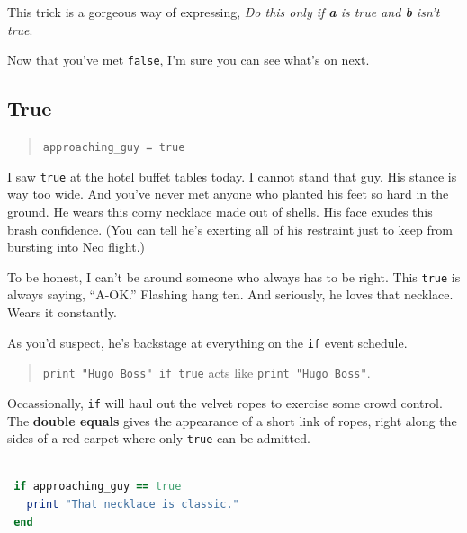 \documentclass[10pt,twoside]{report}
\begin{document}
This trick is a gorgeous way of expressing, {\em Do this only if {\bf
    a} is true and {\bf b} isn't true}.

Now that you've met \lstinline[breaklines=true]|false|, I'm sure you
can see what's on next.


\subsection{True}



\begin{quote}
\lstinline[breaklines=true]|approaching_guy = true|\end{quote}


I saw \lstinline[breaklines=true]|true| at the hotel buffet tables
today.  I cannot stand that guy. His stance is way too wide.  And
you've never met anyone who planted his feet so hard in the ground.
He wears this corny necklace made out of shells.  His face exudes this
brash confidence.  (You can tell he's exerting all of his restraint
just to keep from bursting into Neo flight.)

To be honest, I can't be around someone who always has to be
right. This \lstinline[breaklines=true]|true| is always saying,
``A-OK.''  Flashing hang ten.  And seriously, he loves that necklace.
Wears it constantly.

As you'd suspect, he's backstage at everything on the
\lstinline[breaklines=true]|if| event schedule.

\begin{quote}
\lstinline[breaklines=true]|print "Hugo Boss" if true| acts like
\lstinline[breaklines=true]|print "Hugo Boss"|.\end{quote}


Occassionally, \lstinline[breaklines=true]|if| will haul out the
velvet ropes to exercise some crowd control.  The {\bf double equals}
gives the appearance of a short link of ropes, right along the sides
of a red carpet where only \lstinline[breaklines=true]|true| can be
admitted.


\begin{lstlisting}[basicstyle=\ttfamily\color{basiccolor},
    commentstyle = \ttfamily\color{commentcolor},
    keywordstyle=\ttfamily\color{keywordscolor},
    stringstyle=\color{stringcolor},
    language=Ruby,
    basicstyle=\small\ttfamily,
    showstringspaces=false,
  ]

 if approaching_guy == true 
   print "That necklace is classic."  
 end

\end{lstlisting}
\end{document}
